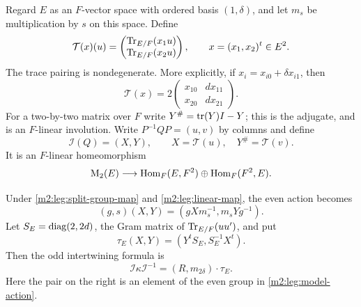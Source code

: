 Regard $E$ as an $F$-vector space with ordered basis $(1,\delta)$, and
let $m_s$ be multiplication by $s$ on this space. Define
\[
 \mathcal T(x)(u)=
 \begin{pmatrix}\operatorname{Tr}_{E/F}(x_1u)\\\operatorname{Tr}_{E/F}(x_2u)\end{pmatrix},
 \qquad x=(x_1,x_2)^t\in E^2.
\]
The trace pairing is nondegenerate. More explicitly, if
$x_i=x_{i0}+\delta x_{i1}$, then
\begin{equation}\label{m2:leg:trace-matrix}
 \mathcal T(x)=2
 \begin{pmatrix}x_{10}&d x_{11}\\x_{20}&d x_{21}\end{pmatrix}.
\end{equation}
For a two-by-two matrix over $F$ write
$Y^\#=\operatorname{tr}(Y)I-Y$; this is the adjugate, and is an $F$-linear
involution. Write $P^{-1}QP=(u,v)$ by columns and define
\begin{equation}\label{m2:leg:linear-map}
 \mathcal I(Q)=(X,Y),\qquad X=\mathcal T(u),
 \quad Y^\#=\mathcal T(v).
\end{equation}
It is an $F$-linear homeomorphism
\[
 \operatorname{M}_2(E)\longrightarrow
 \operatorname{Hom}_F(E,F^2)\oplus\operatorname{Hom}_F(F^2,E).
\]

\begin{lemma}\label{m2:leg:split-intertwining}
Under \eqref{m2:leg:split-group-map} and \eqref{m2:leg:linear-map}, the
even action becomes
\begin{equation}\label{m2:leg:model-action}
 (g,s)(X,Y)=(gXm_s^{-1},m_sYg^{-1}).
\end{equation}
Let $S_E=\operatorname{diag}(2,2d)$, the Gram matrix of
$\operatorname{Tr}_{E/F}(uu')$, and put
\begin{equation}\label{m2:leg:model-odd}
 \tau_E(X,Y)=(Y^tS_E,S_E^{-1}X^t).
\end{equation}
Then the odd intertwining formula is
\begin{equation}\label{m2:leg:odd-intertwining}
 \mathcal I\kappa\mathcal I^{-1}
   =(R,m_{2\delta})\cdot\tau_E.
\end{equation}
Here the pair on the right is an element of the even group in
\eqref{m2:leg:model-action}.
\end{lemma}

